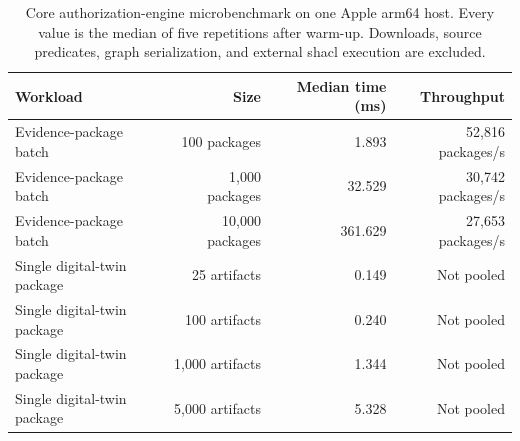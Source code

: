 \begin{table}[!htbp]
\centering
\caption{Core authorization-engine microbenchmark on one Apple arm64 host. Every value is the median of five repetitions after warm-up. Downloads, source predicates, graph serialization, and external \ac{shacl} execution are excluded.}
\label{tab:scalability-results}
\footnotesize
\renewcommand{\arraystretch}{1.05}
\begin{tabularx}{\textwidth}{@{}Y r r r@{}}
\toprule
Workload & Size & Median time (ms) & Throughput \\
\midrule
Evidence-package batch & 100 packages & 1.893 & 52,816 packages/s \\
Evidence-package batch & 1,000 packages & 32.529 & 30,742 packages/s \\
Evidence-package batch & 10,000 packages & 361.629 & 27,653 packages/s \\
Single digital-twin package & 25 artifacts & 0.149 & Not pooled \\
Single digital-twin package & 100 artifacts & 0.240 & Not pooled \\
Single digital-twin package & 1,000 artifacts & 1.344 & Not pooled \\
Single digital-twin package & 5,000 artifacts & 5.328 & Not pooled \\
\bottomrule
\end{tabularx}
\end{table}
